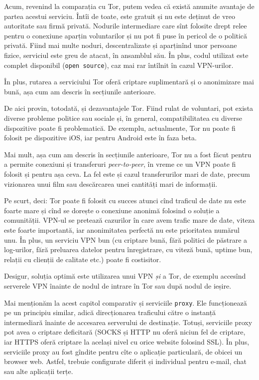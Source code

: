 Acum, revenind la comparația cu Tor, putem vedea că există anumite avantaje
de partea acestui serviciu. Întîi de toate, este gratuit și nu este deținut
de vreo autoritate sau firmă privată. Nodurile intermediare care sînt folosite
drept relee pentru o conexiune aparțin voluntarilor și nu pot fi puse în pericol
de o politică privată. Fiind mai multe noduri, descentralizate și aparținînd unor
persoane fizice, serviciul este greu de atacat, în ansamblul său.
În plus, codul utilizat este complet disponibil
(\texttt{open source}), caz mai rar întîlnit în cazul VPN-urilor.

În plus, rutarea  a serviciului Tor oferă criptare suplimentară
și o anonimizare mai bună, așa cum am descris în secțiunile anterioare.

De aici provin, totodată, și dezavantajele Tor. Fiind rulat de voluntari, pot exista
diverse probleme politice sau sociale și, în general, compatibilitatea cu diverse
dispozitive poate fi problematică. De exemplu, actualmente, Tor nu poate fi folosit
pe dispozitive iOS, iar pentru Android este în faza beta.

Mai mult, așa cum am descris în secțiunile anterioare, Tor nu a fost făcut pentru
a permite conexiuni și transferuri \textit{peer-to-peer}, în vreme ce un VPN poate
fi folosit și pentru așa ceva. La fel este și cazul transferurilor mari de date,
precum vizionarea unui film sau descărcarea unei cantități mari de informații.

\vspace{1cm}

Pe scurt, deci: Tor poate fi folosit cu succes atunci cînd traficul de date nu
este foarte mare și cînd se dorește o conexiune anonimă folosind o soluție a
comunității. VPN-ul se pretează cazurilor în care avem trafic mare de date,
viteza este foarte importantă, iar anonimitatea perfectă nu este prioritatea
numărul unu. În plus, un serviciu VPN bun (cu criptare bună, fără politici de
păstrare a log-urilor, fără preluarea datelor pentru înregistrare, cu viteză bună,
uptime bun, relații cu clienții de calitate etc.) poate fi costisitor.

Desigur, soluția optimă este utilizarea unui VPN \textit{și} a Tor, de exemplu
accesînd serverele VPN înainte de nodul de intrare în Tor sau după nodul de
ieșire.

Mai menționăm la acest capitol comparativ și serviciile \texttt{proxy}.
Ele funcționează pe un principiu similar, adică direcționarea traficului către
o instanță intermediară înainte de accesarea serverului de destinație. Totuși,
serviciile proxy pot avea o criptare deficitară (SOCKS și HTTP nu oferă niciun
fel de criptare, iar HTTPS oferă criptare la același nivel cu orice website
folosind SSL). În plus, serviciile proxy au fost gîndite pentru cîte o aplicație
particulară, de obicei un browser web. Astfel, trebuie configurate diferit și
individual pentru e-mail, chat sau alte aplicații terțe.
